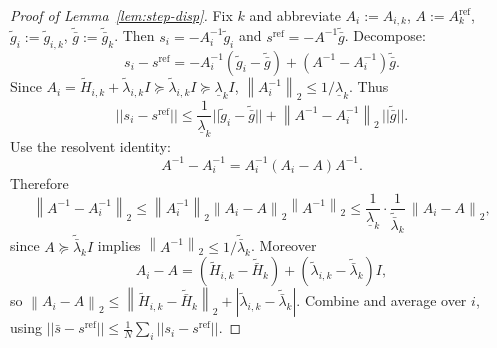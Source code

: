 \documentclass[11pt,a4paper]{article}
\def\norm#1{||#1||}%
\newcommand{\norm}[1]{\left\|#1\right\|}
\newcommand{\normtwo}[1]{\left\|#1\right\|_2}
\begin{document}
	
	\begin{proof}[Proof of Lemma~\ref{lem:step-disp}]
		Fix $k$ and abbreviate $A_i:=A_{i,k}$, $A:=A_k^{\mathrm{ref}}$, $\tilde g_i:=\tilde g_{i,k}$, $\tilde{\bar g}:=\tilde{\bar g}_k$.
		Then $s_i=-A_i^{-1}\tilde g_i$ and $s^{\mathrm{ref}}=-A^{-1}\tilde{\bar g}$.
		Decompose:
		\[
		s_i-s^{\mathrm{ref}}
		=-A_i^{-1}(\tilde g_i-\tilde{\bar g}) + (A^{-1}-A_i^{-1})\tilde{\bar g}.
		\]
		Since $A_i=\tilde H_{i,k}+\tilde\lambda_{i,k}I\succeq \tilde\lambda_{i,k}I\succeq \underline\lambda_k I$,
		$\normtwo{A_i^{-1}}\le 1/\underline\lambda_k$.
		Thus
		\[
		\norm{s_i-s^{\mathrm{ref}}}
		\le \frac{1}{\underline\lambda_k}\norm{\tilde g_i-\tilde{\bar g}} + \normtwo{A^{-1}-A_i^{-1}}\,\norm{\tilde{\bar g}}.
		\]
		Use the resolvent identity:
		\[
		A^{-1}-A_i^{-1}=A_i^{-1}(A_i-A)A^{-1}.
		\]
		Therefore
		\[
		\normtwo{A^{-1}-A_i^{-1}}
		\le \normtwo{A_i^{-1}}\normtwo{A_i-A}\normtwo{A^{-1}}
		\le \frac{1}{\underline\lambda_k}\cdot \frac{1}{\tilde{\bar\lambda}_k}\,\normtwo{A_i-A},
		\]
		since $A\succeq \tilde{\bar\lambda}_k I$ implies $\normtwo{A^{-1}}\le 1/\tilde{\bar\lambda}_k$.
		Moreover
		\[
		A_i-A=(\tilde H_{i,k}-\tilde{\bar H}_k)+(\tilde\lambda_{i,k}-\tilde{\bar\lambda}_k)I,
		\]
		so $\normtwo{A_i-A}\le \normtwo{\tilde H_{i,k}-\tilde{\bar H}_k}+|\tilde\lambda_{i,k}-\tilde{\bar\lambda}_k|$.
		Combine and average over $i$, using
		$\norm{\bar s-s^{\mathrm{ref}}}\le \frac1N\sum_i \norm{s_i-s^{\mathrm{ref}}}$.
	\end{proof}
	
\end{document}
